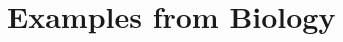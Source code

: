 \section{Examples from Biology}
\label{sec:examples}
\begin{frame}{\insertsubsection}
    
\end{frame}